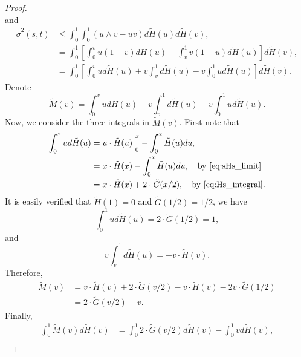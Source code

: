\begin{proof}
\begin{equation*}
	\end{equation*}
	and 
	\begin{equation*}
	\begin{aligned}
	\tilde{\sigma}^2(s,t) &\le \int_{0}^{1} \int_{0}^{1} (u \wedge v -uv) d \tilde{H}(u) d \tilde{H}(v),\\
	&= \int_{0}^{1} \left[\int_{0}^{v} u(1-v) d\tilde{H}(u) + \int_{v}^{1} v(1-u) d\tilde{H}(u)   \right]  d\tilde{H}(v),\\
	&= \int_{0}^{1} \left[\int_{0}^{v} u d\tilde{H}(u) + v\int_{v}^{1} d\tilde{H}(u) -v\int_{0}^{1}u d\tilde{H}(u)  \right]  d\tilde{H}(v).
	\end{aligned}
	\end{equation*}
	Denote 
	\begin{equation*}
	\tilde{M}(v) = \int_{0}^{v} u d\tilde{H}(u) + v\int_{v}^{1} d\tilde{H}(u) -v\int_{0}^{1}u d\tilde{H}(u).
	\end{equation*}
	Now, we consider the three integrals in $\tilde{M}(v)$. First note that
	\begin{equation*}
	\begin{aligned}
	\int_{0}^{x} u d\tilde{H}(u) &= u\cdot \tilde{H}(u) \Bigr|_{0}^x - \int_{0}^{x} \tilde{H}(u) du,\\
	&= x\cdot \tilde{H}(x) - \int_{0}^{x} \tilde{H}(u) du,\quad \text{by \eqref{eq:sHs_limit}}\\
	&=  x\cdot \tilde{H}(x) + 2\cdot \tilde{G}(x/2), \quad \text{by \eqref{eq:Hs_integral}}.
	\end{aligned}
	\end{equation*}
	It is easily verified that $\tilde{H}(1)=0$ and $\tilde{G}(1/2)=1/2$, we have
	\begin{equation*}
	\int_{0}^{1} u d\tilde{H}(u) = 2\cdot \tilde{G}(1/2)=1,
	\end{equation*}
	and
	\begin{equation*}
	v\int_{v}^{1} d\tilde{H}(u) = -v\cdot \tilde{H}(v).
	\end{equation*}
	Therefore,
	\begin{equation*}
	\begin{aligned}
	\tilde{M}(v) &= v\cdot \tilde{H}(v) +2 \cdot \tilde{G}(v/2)-v\cdot \tilde{H}(v)-2v\cdot \tilde{G}(1/2)\\
	&=2 \cdot \tilde{G}(v/2) - v.
	\end{aligned}
	\end{equation*}
	Finally,
	\begin{equation*}
	\begin{aligned}
	\int_{0}^{1} \tilde{M}(v) d\tilde{H}(v) &= \int_{0}^{1} 2 \cdot \tilde{G}(v/2)d\tilde{H}(v) - \int_{0}^{1}v d\tilde{H}(v),\\

\end{aligned}
\end{equation*}
\end{proof}
